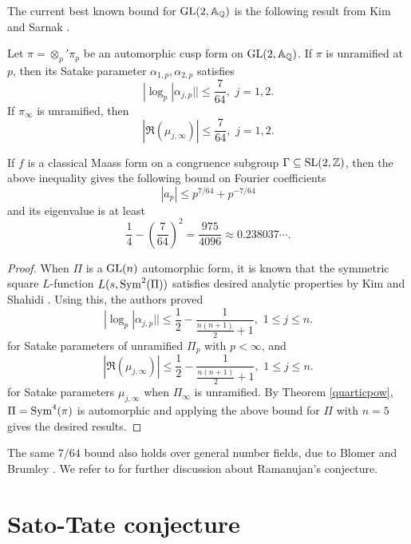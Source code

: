 The current best known bound for $\operatorname{\mathrm{GL}}(2, \mathbb{A}_{\mathbb{Q}})$ is the following result from Kim and Sarnak \cite{kim2003refined}.

\begin{theorem}
Let $\pi = \otimes_{p}'\pi_{p}$ be an automorphic cusp form on $\operatorname{\mathrm{GL}}(2, \mathbb{A}_{\mathbb{Q}})$.
If $\pi$ is unramified at $p$, then its Satake parameter $\alpha_{1, p}, \alpha_{2, p}$ satisfies
$$
|\log_{p}|\alpha_{j, p}|| \leq \frac{7}{64},\,\, j = 1, 2.
$$
If $\pi_{\infty}$ is unramified, then
$$
|\Re(\mu_{j, \infty})|\leq \frac{7}{64},\,\,j = 1, 2.
$$
\end{theorem}
If $f$ is a classical Maass form
on a congruence subgroup $\Gamma \subseteq \operatorname{\mathrm{SL}}(2, \mathbb{Z})$,
then the above inequality gives the following bound on Fourier coefficients
$$
|a_{p}| \leq p^{7/64} + p^{-7/64}
$$
and its eigenvalue is at least
$$
\frac{1}{4} - \left(\frac{7}{64}\right)^{2} = \frac{975}{4096} \approx 0.238037\cdots.
$$
\begin{proof}
When $\Pi$ is a $\operatorname{\mathrm{GL}}(n)$ automorphic form, it is known that the symmetric square $L$-function $L(s, \mathrm{Sym}^{2}(\Pi))$
satisfies desired analytic properties by Kim and Shahidi \cite{kim1999langlands,shahidi1988ramanujan}.
Using this, the authors proved
$$
|\log_{p}|\alpha_{j, p}|| \leq \frac{1}{2} - \frac{1}{\frac{n(n+1)}{2} + 1},\,\, 1\leq j \leq n.
$$
for Satake parameters of unramified $\Pi_{p}$ with $p <\infty$, and
$$
|\Re(\mu_{j, \infty})|\leq \frac{1}{2} - \frac{1}{\frac{n(n+1)}{2} + 1},\,\, 1\leq j \leq n.
$$
for Satake parameters $\mu_{j, \infty}$ when $\Pi_{\infty}$ is unramified.
By Theorem \ref{quarticpow}, $\Pi = \mathrm{Sym}^{4}(\pi)$ is automorphic 
and applying the above bound for $\Pi$ with $n = 5$ gives the desired results.
\end{proof}
The same $7/64$ bound also holds over general number fields, due to Blomer and Brumley \cite{blomer2011ramanujan}.
We refer to \cite{sarnak2005notes,blomer2013role,winnie2020ramanujan} for further discussion
about Ramanujan's conjecture.

\section{Sato-Tate conjecture}

